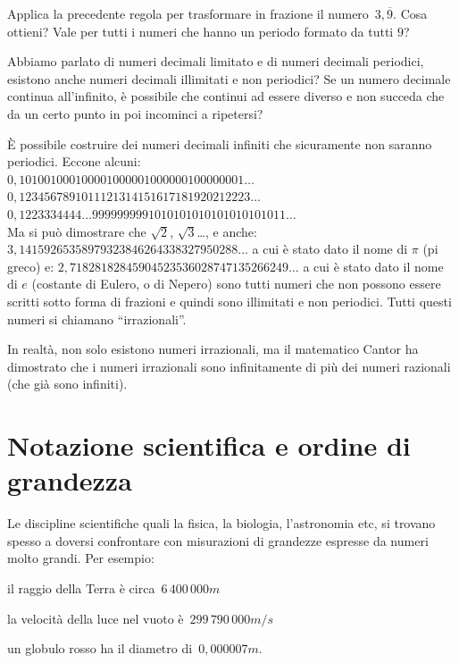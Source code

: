 \begin{osservazione}{}{}
 Applica la precedente regola per trasformare in frazione il 
 numero~\(3,\overline{9}\). Cosa ottieni? 
 Vale per tutti i numeri che hanno un periodo formato da tutti \(9\)?
\end{osservazione}

Abbiamo parlato di numeri decimali limitato e di numeri decimali 
periodici, esistono anche numeri decimali illimitati e non periodici?
Se un numero decimale continua all'infinito, è possibile che continui ad 
essere diverso e non succeda che da un certo punto in poi incominci a 
ripetersi?

È possibile costruire dei numeri decimali infiniti che sicuramente non 
saranno periodici. Eccone alcuni:\\
\(0,101001000100001000001000000100000001\dots\)\\
\(0,1234567891011121314151617181920212223\dots\)\\
\(0,1223334444\dots9999999991010101010101010101011\dots\)\\
Ma si può dimostrare che \(\sqrt{2}\), \(\sqrt{3}\)\dots, 
e anche: 
\(3,14159265358979323846264338327950288\dots\) 
a cui è stato dato il nome di \(\pi\) (pi greco) e:
\(2,71828182845904523536028747135266249\dots\)
a cui è stato dato il nome di \(e\) (costante di Eulero, o di Nepero) sono 
tutti numeri che non possono essere scritti sotto forma di frazioni e quindi 
sono illimitati e non periodici.
Tutti questi numeri si chiamano ``irrazionali''.

\begin{osservazione}{}{}
In realtà, non solo esistono numeri irrazionali, ma il matematico Cantor ha 
dimostrato che i numeri irrazionali sono infinitamente di più dei numeri 
razionali (che già sono infiniti).
\end{osservazione}

\section{Notazione scientifica e ordine di grandezza}
\label{sec:razionali_notazione_scientifica}

Le discipline scientifiche quali la fisica, la biologia, l'astronomia etc,
si trovano spesso a doversi confrontare con misurazioni di grandezze 
espresse 
da numeri molto grandi. Per esempio:

\begin{itemize*}
\item il raggio della Terra è circa~\(6\,400\,000\unit{m}\)
\item la velocità della luce nel vuoto è~\(299\,790\,000\unit{m/s}\)
\item un globulo rosso ha il diametro di~\(0,000007\unit{m}\).
\end{itemize*}

